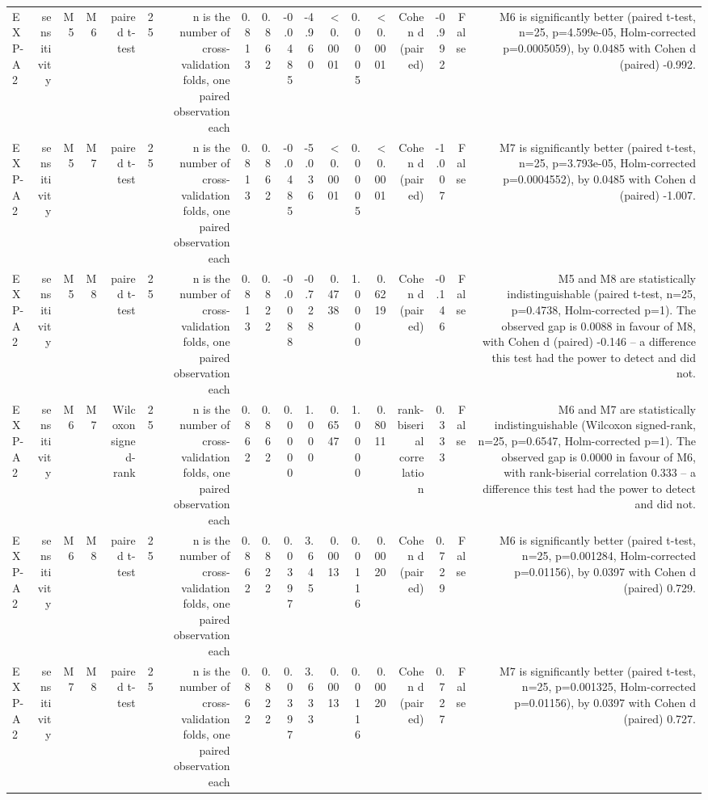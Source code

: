 \begin{table}[htbp]
\begin{tabular}{lrrrrrrrrrrrrrrrrr}
    EXP-A2 & sensitivity & M5 & M6 & paired t-test & 25 & n is the number of cross-validation folds, one paired observation each & 0.813 & 0.862 & -0.0485 & -4.960 & <0.0001 & 0.0005 & <0.0001 & Cohen d (paired) & -0.992 & False & M6 is significantly better (paired t-test, n=25, p=4.599e-05, Holm-corrected p=0.0005059), by 0.0485 with Cohen d (paired) -0.992. \\
    EXP-A2 & sensitivity & M5 & M7 & paired t-test & 25 & n is the number of cross-validation folds, one paired observation each & 0.813 & 0.862 & -0.0485 & -5.036 & <0.0001 & 0.0005 & <0.0001 & Cohen d (paired) & -1.007 & False & M7 is significantly better (paired t-test, n=25, p=3.793e-05, Holm-corrected p=0.0004552), by 0.0485 with Cohen d (paired) -1.007. \\
    EXP-A2 & sensitivity & M5 & M8 & paired t-test & 25 & n is the number of cross-validation folds, one paired observation each & 0.813 & 0.822 & -0.0088 & -0.728 & 0.4738 & 1.0000 & 0.6219 & Cohen d (paired) & -0.146 & False & M5 and M8 are statistically indistinguishable (paired t-test, n=25, p=0.4738, Holm-corrected p=1). The observed gap is 0.0088 in favour of M8, with Cohen d (paired) -0.146 -- a difference this test had the power to detect and did not. \\
    EXP-A2 & sensitivity & M6 & M7 & Wilcoxon signed-rank & 25 & n is the number of cross-validation folds, one paired observation each & 0.862 & 0.862 & 0.0000 & 1.000 & 0.6547 & 1.0000 & 0.8011 & rank-biserial correlation & 0.333 & False & M6 and M7 are statistically indistinguishable (Wilcoxon signed-rank, n=25, p=0.6547, Holm-corrected p=1). The observed gap is 0.0000 in favour of M6, with rank-biserial correlation 0.333 -- a difference this test had the power to detect and did not. \\
    EXP-A2 & sensitivity & M6 & M8 & paired t-test & 25 & n is the number of cross-validation folds, one paired observation each & 0.862 & 0.822 & 0.0397 & 3.645 & 0.0013 & 0.0116 & 0.0020 & Cohen d (paired) & 0.729 & False & M6 is significantly better (paired t-test, n=25, p=0.001284, Holm-corrected p=0.01156), by 0.0397 with Cohen d (paired) 0.729. \\
    EXP-A2 & sensitivity & M7 & M8 & paired t-test & 25 & n is the number of cross-validation folds, one paired observation each & 0.862 & 0.822 & 0.0397 & 3.633 & 0.0013 & 0.0116 & 0.0020 & Cohen d (paired) & 0.727 & False & M7 is significantly better (paired t-test, n=25, p=0.001325, Holm-corrected p=0.01156), by 0.0397 with Cohen d (paired) 0.727. \\

\end{tabular}
\end{table}
